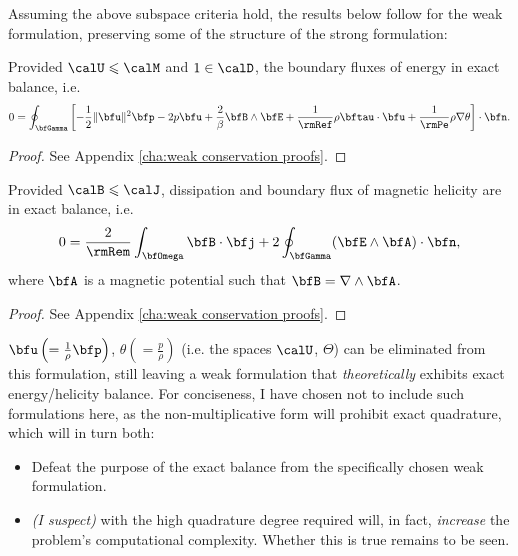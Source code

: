    Assuming the above subspace criteria hold, the results below follow for the weak formulation, preserving some of the structure of the strong formulation:
    
    \begin{theorem}
        Provided $\calU  \leqslant  \calM$ and $1  \in  \calD$, the boundary fluxes of energy in exact balance, i.e.
        \begin{equation}
            0  =  \oint_{\bfGamma}\left[- \frac{1}{2}\|\bfu\|^{2}\bfp - 2p\bfu + \frac{2}{\beta}\bfB\wedge\bfE + \frac{1}{\rmRef}\rho\bftau\cdot\bfu + \frac{1}{\rmPe}\rho\nabla\theta\right]\cdot\bfn.
        \end{equation}
    \end{theorem}
    \begin{proof}
        See Appendix \ref{cha:weak conservation proofs}.
    \end{proof}
    
    \begin{theorem}
        Provided $\calB  \leqslant  \calJ$, dissipation and boundary flux of magnetic helicity are in exact balance, i.e.
        \begin{equation}
            0  =  \frac{2}{\rmRem}\int_{\bfOmega}\bfB\cdot\bfj + 2\oint_{\bfGamma}(\bfE\wedge\bfA)\cdot\bfn,
        \end{equation}
        where $\bfA$ is a magnetic potential such that $\bfB  =  \nabla\wedge\bfA$.
    \end{theorem}
    \begin{proof}
        See Appendix \ref{cha:weak conservation proofs}.
    \end{proof}

    \begin{remark}
        $\bfu  \left(=  \frac{1}{\rho}\bfp\right)$, $\theta  \left(=  \frac{p}{\rho}\right)$ (i.e. the spaces $\calU$, $\Theta$) can be eliminated from this formulation, still leaving a weak formulation that \emph{theoretically} exhibits exact energy/helicity balance. For conciseness, I have chosen not to include such formulations here, as the non-multiplicative form will prohibit exact quadrature, which will in turn both:
        \begin{itemize}
            \item  Defeat the purpose of the exact balance from the specifically chosen weak formulation.
            \item  \emph{(I suspect)} with the high quadrature degree required will, in fact, \emph{increase} the problem's computational complexity. Whether this is true remains to be seen. 
        \end{itemize}
    \end{remark}
    